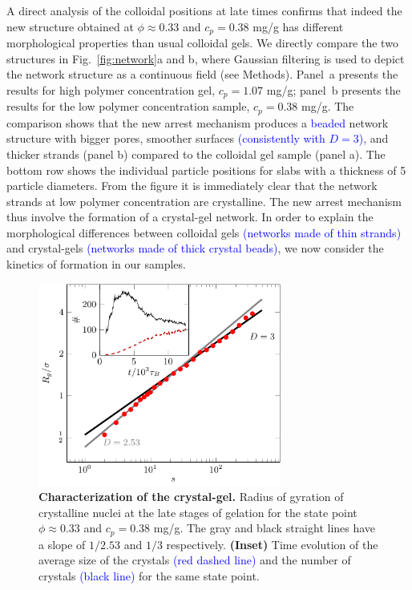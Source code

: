 \documentclass[preprint,amsmath,amssymb,superscriptaddress]{revtex4-1}
\begin{document}
A direct analysis of the colloidal positions at late times confirms that indeed the new structure obtained at
$\phi\approx 0.33$ and $c_p=0.38$ mg/g has different morphological properties than usual colloidal gels.
We directly compare the two structures in Fig.~\ref{fig:network}a and b, where Gaussian filtering is used to depict the network structure as a continuous field (see Methods).
Panel~a presents the results for high polymer concentration gel, $c_p=1.07$ mg/g; panel~b presents the results for the low polymer concentration sample, $c_p=0.38$ mg/g.
The comparison shows that the new arrest mechanism produces a \textcolor{blue}{beaded} network structure with bigger pores, smoother surfaces \textcolor{blue}{(consistently with $D=3$)}, and thicker strands (panel b) compared 
to the colloidal gel sample (panel a). The bottom row shows the individual particle positions for slabs with a thickness of 5 particle diameters. 
From the figure it is immediately clear that the network strands at low polymer concentration are crystalline. The new arrest mechanism thus
involve the formation of a crystal-gel network. In order to explain the morphological differences between colloidal gels \textcolor{blue}{(networks made of thin strands)} and crystal-gels \textcolor{blue}{(networks made of thick crystal beads)},
we now consider the kinetics of formation in our samples. 

\begin{figure}
 \includegraphics[width=8cm]{characterisation}
\caption{{\bf Characterization of the crystal-gel.} 
Radius of gyration of crystalline nuclei at the late stages of gelation for the state point $\phi\approx 0.33$ and $c_p=0.38$ mg/g.
The gray and black straight lines have a slope of $1/2.53$ and $1/3$ respectively. 
\textbf{(Inset)} Time evolution of the average size of the crystals \textcolor{blue}{(red dashed line)} and the number of crystals 
\textcolor{blue}{(black line)} for the same state point.
} 
 \label{fig:crystals}
\end{figure}
\end{document}
